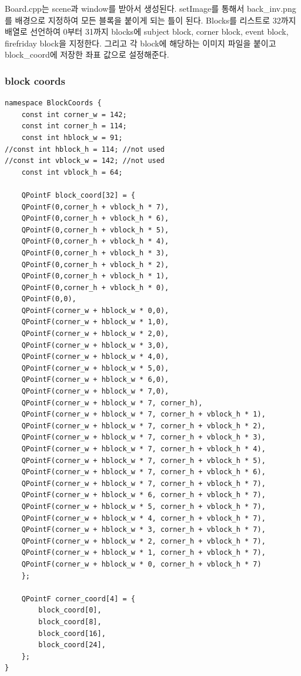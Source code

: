 \documentclass[10pt,oneside,a4paper,titlepage]{article}
\begin{document}
Board.cpp는 scene과 window를 받아서 생성된다. setImage를 통해서 back\_inv.png를 배경으로 지정하여 모든 블록을 붙이게 되는 틀이 된다. Blocks를 리스트로 32까지 배열로 선언하여 0부터 31까지 blocks에 subject block, corner block, event block, firefriday block을 지정한다. 그리고 각 block에 해당하는 이미지 파일을 붙이고 block\_coord에 저장한 좌표 값으로 설정해준다.

\subsubsection{block coords}


\begin{lstlisting}
namespace BlockCoords {
    const int corner_w = 142;
    const int corner_h = 114;
    const int hblock_w = 91;
//const int hblock_h = 114; //not used
//const int vblock_w = 142; //not used
    const int vblock_h = 64;

    QPointF block_coord[32] = {
    QPointF(0,corner_h + vblock_h * 7),
    QPointF(0,corner_h + vblock_h * 6),
    QPointF(0,corner_h + vblock_h * 5),
    QPointF(0,corner_h + vblock_h * 4),
    QPointF(0,corner_h + vblock_h * 3),
    QPointF(0,corner_h + vblock_h * 2),
    QPointF(0,corner_h + vblock_h * 1),
    QPointF(0,corner_h + vblock_h * 0),
    QPointF(0,0),
    QPointF(corner_w + hblock_w * 0,0),
    QPointF(corner_w + hblock_w * 1,0),
    QPointF(corner_w + hblock_w * 2,0),
    QPointF(corner_w + hblock_w * 3,0),
    QPointF(corner_w + hblock_w * 4,0),
    QPointF(corner_w + hblock_w * 5,0),
    QPointF(corner_w + hblock_w * 6,0),
    QPointF(corner_w + hblock_w * 7,0),
    QPointF(corner_w + hblock_w * 7, corner_h),
    QPointF(corner_w + hblock_w * 7, corner_h + vblock_h * 1),
    QPointF(corner_w + hblock_w * 7, corner_h + vblock_h * 2),
    QPointF(corner_w + hblock_w * 7, corner_h + vblock_h * 3),
    QPointF(corner_w + hblock_w * 7, corner_h + vblock_h * 4),
    QPointF(corner_w + hblock_w * 7, corner_h + vblock_h * 5),
    QPointF(corner_w + hblock_w * 7, corner_h + vblock_h * 6),
    QPointF(corner_w + hblock_w * 7, corner_h + vblock_h * 7),
    QPointF(corner_w + hblock_w * 6, corner_h + vblock_h * 7),
    QPointF(corner_w + hblock_w * 5, corner_h + vblock_h * 7),
    QPointF(corner_w + hblock_w * 4, corner_h + vblock_h * 7),
    QPointF(corner_w + hblock_w * 3, corner_h + vblock_h * 7),
    QPointF(corner_w + hblock_w * 2, corner_h + vblock_h * 7),
    QPointF(corner_w + hblock_w * 1, corner_h + vblock_h * 7),
    QPointF(corner_w + hblock_w * 0, corner_h + vblock_h * 7)
    };

    QPointF corner_coord[4] = {
        block_coord[0],
        block_coord[8],
        block_coord[16],
        block_coord[24],
    };
}
\end{lstlisting}
\end{document}
